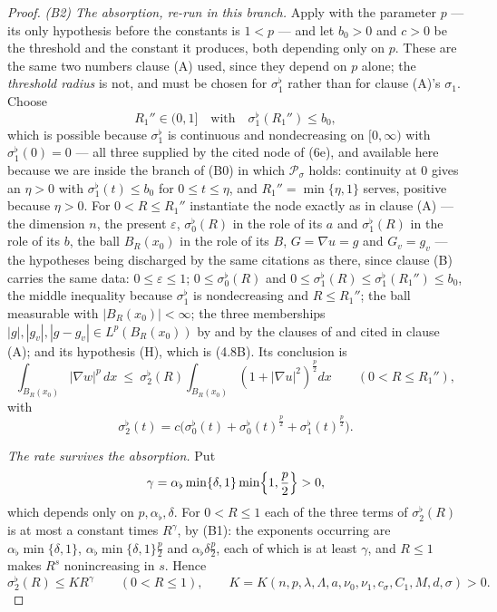 \begin{proof}
\emph{(B2) The absorption, re-run in this branch.}  Apply
 with the parameter $p$ --- its only
hypothesis before the constants is $1<p$ --- and let $b_0>0$ and $c>0$ be the
threshold and the constant it produces, both depending only on $p$.  These are
the same two numbers clause (A) used, since they depend on $p$ alone; the
\emph{threshold radius} is not, and must be chosen for
$\sigma_1^{\flat}$ rather than for clause (A)'s $\sigma_1$.  Choose
\[
R_1''\in(0,1]\quad\text{with}\quad\sigma_1^{\flat}(R_1'')\le b_0 ,
\]
which is possible because $\sigma_1^{\flat}$ is continuous and nondecreasing on
$[0,\infty)$ with $\sigma_1^{\flat}(0)=0$ --- all three supplied by the cited
node of (6e), and available here because we are inside the branch of (B0) in
which $\mathcal P_\sigma$ holds: continuity at $0$ gives an $\eta>0$
with $\sigma_1^{\flat}(t)\le b_0$ for $0\le t\le\eta$, and $R_1''=\min\{\eta,1\}$
serves, positive because $\eta>0$.  For $0<R\le R_1''$ instantiate the node exactly as in clause (A) ---
the dimension $n$, the present $\varepsilon$, $\sigma_0^{\flat}(R)$ in the role
of its $a$ and $\sigma_1^{\flat}(R)$ in the role of its $b$, the ball
$B_R(x_0)$ in the role of its $B$, $G=\nabla u=g$ and $G_v=g_v$ --- the
hypotheses being discharged by the same citations as there, since clause (B)
carries the same data: $0\le\varepsilon\le1$; $0\le\sigma_0^{\flat}(R)$ and
$0\le\sigma_1^{\flat}(R)\le\sigma_1^{\flat}(R_1'')\le b_0$, the middle
inequality because $\sigma_1^{\flat}$ is nondecreasing and $R\le R_1''$; the
ball measurable with $|B_R(x_0)|<\infty$; the three memberships
$|g|,|g_v|,|g-g_v|\in L^p(B_R(x_0))$ by  and by the clauses of
 and  cited in clause (A);
and its hypothesis (H), which is (4.8B).  Its conclusion is
\[
\int_{B_R(x_0)}|\nabla w|^p\,dx\ \le\ \sigma_2^{\flat}(R)
\int_{B_R(x_0)}(1+|\nabla u|^2)^{\frac p2}dx
\qquad(0<R\le R_1''),
\tag{4.9B}
\]
with
\[
\sigma_2^{\flat}(t)=c\bigl(\sigma_0^{\flat}(t)+\sigma_0^{\flat}(t)^{\frac p2}
+\sigma_1^{\flat}(t)^{\frac p2}\bigr).
\]

\emph{The rate survives the absorption.}  Put
\[
\gamma=\alpha_\flat\min\{\delta,1\}\min\Bigl\{1,\frac p2\Bigr\}>0 ,
\]
which depends only on $p,\alpha_\flat,\delta$.  For $0<R\le1$ each of the three
terms of $\sigma_2^{\flat}(R)$ is at most a constant times $R^{\gamma}$, by
(B1): the exponents occurring are $\alpha_\flat\min\{\delta,1\}$,
$\alpha_\flat\min\{\delta,1\}\frac p2$ and $\alpha_\flat\delta\frac p2$, each of
which is at least $\gamma$, and $R\le1$ makes $R^{s}$ nonincreasing in $s$.
Hence
\[
\sigma_2^{\flat}(R)\le KR^{\gamma}\qquad(0<R\le1),
\qquad K=K(n,p,\lambda,\Lambda,a,\nu_0,\nu_1,c_\sigma,C_1,M,d,\sigma)>0 .
\]


\end{proof}
